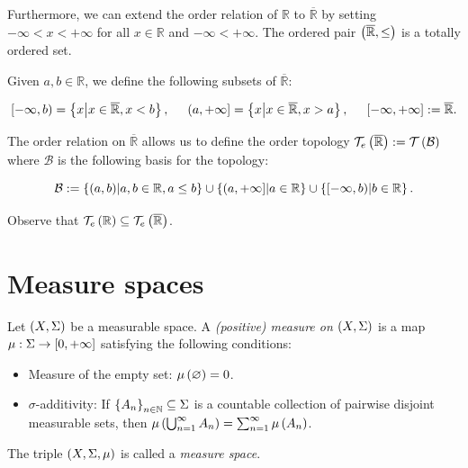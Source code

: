Furthermore, we can extend the order relation of $\mathbb{R}$ to $\overline{\mathbb{R}}$ by setting $-\infty<x<+\infty$ for all $x\in\mathbb{R}$ and $-\infty<+\infty$. The ordered pair $\left(\overline{\mathbb{R}},\leq\right)$ is a totally ordered set. 

Given $a,b\in\mathbb{R}$, we define the following subsets of $\overline{\mathbb{R}}$:

\begin{equation}
  \left[-\infty,b\right)=\left\{x\middle|x\in\overline{\mathbb{R}},x<b\right\},\hspace{0.5cm}\left(a,+\infty\right]=\left\{x\middle|x\in\overline{\mathbb{R}},x>a\right\},\hspace{0.5cm}\left[-\infty,+\infty\right]:=\overline{\mathbb{R}}.
\end{equation}

The order relation on $\overline{\mathbb{R}}$ allows us to define the order topology $\mathcal{T}_e\left(\overline{\mathbb{R}}\right):=\mathcal{T}\left(\mathcal{B}\right)$ where $\mathcal{B}$ is the following basis for the topology:

\begin{equation}
  \mathcal{B}:=\left\{\left(a,b\right)\middle|a,b\in\mathbb{R},a\leq b\right\}\cup\left\{\left(a,+\infty\right]\middle|a\in\mathbb{R}\right\}\cup\left\{\left[-\infty,b\right)\middle|b\in\mathbb{R}\right\}.
\end{equation}

Observe that $\mathcal{T}_e\left(\mathbb{R}\right)\subseteq\mathcal{T}_e\left(\overline{\mathbb{R}}\right)$.

\section{Measure spaces}

\begin{definition}
  Let $\left(X,\Sigma\right)$ be a measurable space. A \emph{(positive) measure on $\left(X,\Sigma\right)$} is a map $\mu:\Sigma\rightarrow\left[0,+\infty\right]$ satisfying the following conditions:

  \begin{itemize}
    \item Measure of the empty set: $\mu\left(\varnothing\right)=0$.
    \item $\sigma$-additivity: If $\left\{A_n\right\}_{n\in\mathbb{N}}\subseteq\Sigma$ is a countable collection of pairwise disjoint measurable sets, then $\mu\left(\bigcup_{n=1}^{\infty}{A_n}\right)=\sum_{n=1}^{\infty}{\mu\left(A_n\right)}$.
  \end{itemize}

  The triple $\left(X,\Sigma,\mu\right)$ is called a \emph{measure space}.
\end{definition}

